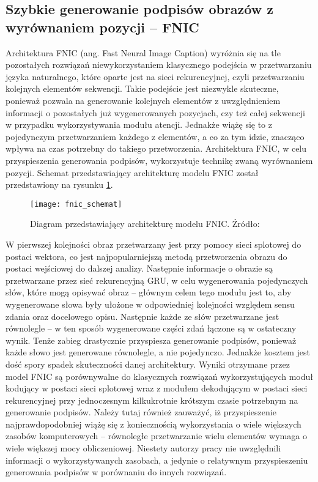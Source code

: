 \subsection{Szybkie generowanie podpisów obrazów z wyrównaniem pozycji -- FNIC}
Architektura FNIC \cite{fnic} (ang. Fast Neural Image Caption) wyróżnia się na tle pozostałych rozwiązań niewykorzystaniem klasycznego podejścia w przetwarzaniu języka naturalnego, które oparte jest na sieci rekurencyjnej, czyli przetwarzaniu kolejnych elementów sekwencji. Takie podejście jest niezwykle skuteczne, ponieważ pozwala na generowanie kolejnych elementów z uwzględnieniem informacji o pozostałych już wygenerowanych pozycjach, czy też całej sekwencji w przypadku wykorzystywania modułu atencji. Jednakże wiążę się to z pojedynczym przetwarzaniem każdego z elementów, a co za tym idzie, znacząco wpływa na czas potrzebny do takiego przetworzenia. Architektura FNIC, w celu przyspieszenia generowania podpisów, wykorzystuje technikę zwaną wyrównaniem pozycji. Schemat przedstawiający architekturę modelu FNIC został przedstawiony na rysunku \ref{fig:fnic-schemat}.
\begin{figure}[H]
  \centering
  \texttt{[image: fnic\_schemat]}
  \caption{Diagram przedstawiający architekturę modelu FNIC. Źródło: \cite{fnic}}
  \label{fig:fnic-schemat}
\end{figure}
\noindent W pierwszej kolejności obraz przetwarzany jest przy pomocy sieci splotowej do postaci wektora, co jest najpopularniejszą metodą przetworzenia obrazu do postaci wejściowej do dalszej analizy. Następnie informacje o obrazie są przetwarzane przez sieć rekurencyjną GRU, w celu wygenerowania pojedynczych słów, które mogą opisywać obraz -- głównym celem tego modułu jest to, aby wygenerowane słowa były ułożone w odpowiedniej kolejności względem sensu zdania oraz docelowego opisu. Następnie każde ze słów przetwarzane jest równolegle -- w ten sposób wygenerowane części zdań łączone są w ostateczny wynik. Tenże zabieg drastycznie przyspiesza generowanie podpisów, ponieważ każde słowo jest generowane równolegle, a nie pojedynczo. Jednakże kosztem jest dość spory spadek skuteczności danej architektury. Wyniki otrzymane przez model FNIC są porównywalne do klasycznych rozwiązań wykorzystujących moduł kodujący w postaci sieci splotowej wraz z modułem dekodującym w postaci sieci rekurencyjnej przy jednoczesnym kilkukrotnie krótszym czasie potrzebnym na generowanie podpisów. Należy tutaj również zauważyć, iż przyspieszenie najprawdopodobniej wiążę się z koniecznością wykorzystania o wiele większych zasobów komputerowych -- równoległe przetwarzanie wielu elementów wymaga o wiele większej mocy obliczeniowej. Niestety autorzy pracy nie uwzględnili informacji o wykorzystywanych zasobach, a jedynie o relatywnym przyspieszeniu generowania podpisów w porównaniu do innych rozwiązań.

